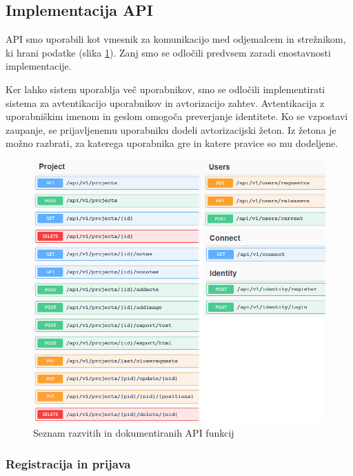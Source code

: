 \documentclass[a4paper, 12pt]{book}
\begin{document}
\subsection{Implementacija API}

API smo uporabili kot vmesnik za komunikacijo med odjemalcem in strežnikom, ki hrani podatke (slika \ref{api_routes}).
Zanj smo se odločili predvsem zaradi enostavnosti implementacije.

Ker lahko sistem uporablja več uporabnikov, smo se odločili implementirati sistema za avtentikacijo uporabnikov in avtorizacijo zahtev.
Avtentikacija z uporabniškim imenom in geslom omogoča preverjanje identitete.
Ko se vzpostavi zaupanje, se prijavljenemu uporabniku dodeli avtorizacijski žeton.
Iz žetona je možno razbrati, za katerega uporabnika gre in katere pravice so mu dodeljene.


\begin{figure}[H]
\begin{center}
\includegraphics[width=13.5cm]{api_routes_small}
\end{center}
\caption{Seznam razvitih in dokumentiranih API funkcij}
\label{api_routes}
\end{figure}

\subsubsection{Registracija in prijava}
\end{document}
